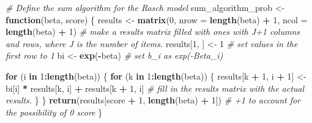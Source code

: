 \documentclass[
]{article}
\newenvironment{Shaded}{\begin{snugshade}}{\end{snugshade}}
\newcommand{\AttributeTok}[1]{\textcolor[rgb]{0.13,0.29,0.53}{#1}}
\newcommand{\CommentTok}[1]{\textcolor[rgb]{0.56,0.35,0.01}{\textit{#1}}}
\newcommand{\ControlFlowTok}[1]{\textcolor[rgb]{0.13,0.29,0.53}{\textbf{#1}}}
\newcommand{\DecValTok}[1]{\textcolor[rgb]{0.00,0.00,0.81}{#1}}
\newcommand{\FunctionTok}[1]{\textcolor[rgb]{0.13,0.29,0.53}{\textbf{#1}}}
\newcommand{\NormalTok}[1]{#1}
\newcommand{\OtherTok}[1]{\textcolor[rgb]{0.56,0.35,0.01}{#1}}
\newcommand{\SpecialCharTok}[1]{\textcolor[rgb]{0.81,0.36,0.00}{\textbf{#1}}}
\begin{document}
\begin{Shaded}
\begin{Highlighting}[]
\CommentTok{\# Define the sum algorithm for the Rasch model}
\NormalTok{sum\_algorithm\_prob }\OtherTok{\textless{}{-}} \ControlFlowTok{function}\NormalTok{(beta, score) \{}
\NormalTok{  results }\OtherTok{\textless{}{-}} \FunctionTok{matrix}\NormalTok{(}\DecValTok{0}\NormalTok{, }\AttributeTok{nrow =} \FunctionTok{length}\NormalTok{(beta) }\SpecialCharTok{+} \DecValTok{1}\NormalTok{, }\AttributeTok{ncol =} \FunctionTok{length}\NormalTok{(beta) }\SpecialCharTok{+} \DecValTok{1}\NormalTok{) }\CommentTok{\# make a results matrix filled with ones with J+1 columns and rows, where J is the number of items. }
\NormalTok{  results[}\DecValTok{1}\NormalTok{, ] }\OtherTok{\textless{}{-}} \DecValTok{1} \CommentTok{\# set values in the first row to 1}
\NormalTok{  bi }\OtherTok{\textless{}{-}} \FunctionTok{exp}\NormalTok{(}\SpecialCharTok{{-}}\NormalTok{beta) }\CommentTok{\# set b\_i as exp({-}Beta\_i)}
  
  \ControlFlowTok{for}\NormalTok{ (i }\ControlFlowTok{in} \DecValTok{1}\SpecialCharTok{:}\FunctionTok{length}\NormalTok{(beta)) \{}
    \ControlFlowTok{for}\NormalTok{ (k }\ControlFlowTok{in} \DecValTok{1}\SpecialCharTok{:}\FunctionTok{length}\NormalTok{(beta)) \{}
\NormalTok{      results[k }\SpecialCharTok{+} \DecValTok{1}\NormalTok{, i }\SpecialCharTok{+} \DecValTok{1}\NormalTok{] }\OtherTok{\textless{}{-}}\NormalTok{ bi[i] }\SpecialCharTok{*}\NormalTok{ results[k, i] }\SpecialCharTok{+}\NormalTok{ results[k }\SpecialCharTok{+} \DecValTok{1}\NormalTok{, i] }\CommentTok{\# fill in the results matrix with the actual results. }
\NormalTok{    \}}
\NormalTok{  \}}
  \FunctionTok{return}\NormalTok{(results[score }\SpecialCharTok{+} \DecValTok{1}\NormalTok{, }\FunctionTok{length}\NormalTok{(beta) }\SpecialCharTok{+} \DecValTok{1}\NormalTok{])  }\CommentTok{\# +1 to account for the possibility of 0 score}
\NormalTok{\}}
\end{Highlighting}
\end{Shaded}
\end{document}
